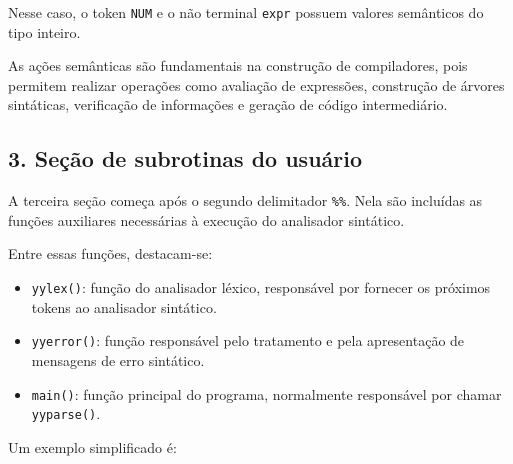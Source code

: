 \documentclass[
  brazilian,
  letterpaper,
]{book}
\providecommand{\tightlist}{%
  \setlength{\itemsep}{0pt}\setlength{\parskip}{0pt}}
\theoremstyle{plain}
\theoremstyle{definition}
\theoremstyle{remark}
\begin{document}
Nesse caso, o token \texttt{NUM} e o não terminal \texttt{expr} possuem
valores semânticos do tipo inteiro.

As ações semânticas são fundamentais na construção de compiladores, pois
permitem realizar operações como avaliação de expressões, construção de
árvores sintáticas, verificação de informações e geração de código
intermediário.

\subsection{3. Seção de subrotinas do
usuário}\label{seuxe7uxe3o-de-subrotinas-do-usuuxe1rio}

A terceira seção começa após o segundo delimitador \texttt{\%\%}. Nela
são incluídas as funções auxiliares necessárias à execução do analisador
sintático.

Entre essas funções, destacam-se:

\begin{itemize}
\tightlist
\item
  \texttt{yylex()}: função do analisador léxico, responsável por
  fornecer os próximos tokens ao analisador sintático.
\item
  \texttt{yyerror()}: função responsável pelo tratamento e pela
  apresentação de mensagens de erro sintático.
\item
  \texttt{main()}: função principal do programa, normalmente responsável
  por chamar \texttt{yyparse()}.
\end{itemize}

Um exemplo simplificado é:
\end{document}

